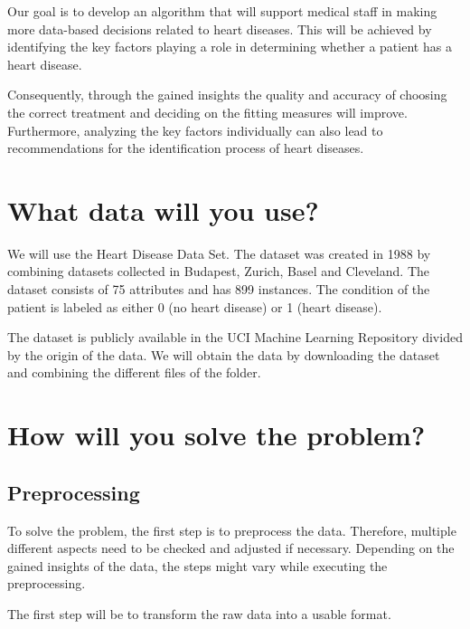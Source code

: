 \documentclass[11pt,titlepage,oneside,openany]{book}
\begin{document}
Our goal is to develop an algorithm that will support medical staff in making more data-based decisions related to heart diseases. This will be achieved by identifying the key factors playing a role in determining whether a patient has a heart disease. 

Consequently, through the gained insights the quality and accuracy of choosing the correct treatment and deciding on the fitting measures will improve. Furthermore, analyzing the key factors individually can also lead to recommendations for the identification process of heart diseases. 


\section{What data will you use?}
\label{sec:data}

We will use the Heart Disease Data Set. The dataset was created in 1988 by combining datasets collected in Budapest, Zurich, Basel and Cleveland. The dataset consists of 75 attributes and has 899 instances. The condition of the patient is labeled as either 0 (no heart disease) or 1 (heart disease).

The dataset is publicly available in the UCI Machine Learning Repository divided by the origin of the data. We will obtain the data by downloading the dataset and combining the different files of the folder.

\section{How will you solve the problem?}
\label{cha:solve}

\subsection{Preprocessing}
To solve the problem, the first step is to preprocess the data. Therefore, multiple different aspects need to be checked and adjusted if necessary. Depending on the gained insights of the data, the steps might vary while executing the preprocessing. 

The first step will be to transform the raw data into a usable format.
\end{document}
